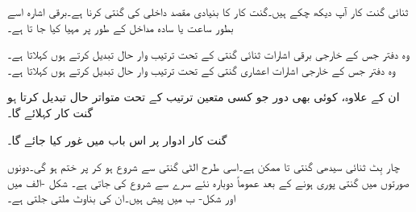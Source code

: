 ثنائی گنت کار آپ دیکھ چکے ہیں۔گنت کار کا بنیادی مقصد داخلی کی گنتی کرنا ہے۔برقی اشارہ اسے بطور ساعت یا سادہ مداخل کے طور پر مہیا کیا جا تا ہے۔

وہ دفتر جس کے خارجی برقی اشارات ثنائی گنتی کے تحت ترتیب وار حال تبدیل کرتے ہوں  کہلاتا ہے۔ وہ دفتر جس کے خارجی اشارات اعشاری گنتی کے تحت ترتیب وار حال تبدیل کرتے ہوں  کہلاتا ہے۔

ان کے علاوہ، کوئی بھی دور جو کسی متعین ترتیب کے تحت متواتر حال تبدیل کرتا ہو گنت کار کہلائے گا۔

گنت کار ادوار پر اس باب میں غور کیا جائے گا۔

چار بِٹ ثنائی سیدھی گنتی  تا  ممکن ہے۔اسی طرح الٹی گنتی  سے شروع ہو کر  پر ختم ہو گی۔دونوں صورتوں میں گنتی پوری ہونے کے بعد عموماً دوبارہ نئے سرے سے شروع کی جاتی ہے۔ شکل  -الف میں  اور شکل- ب میں  پیش ہیں۔ان کی بناوٹ ملتی جلتی ہے۔
